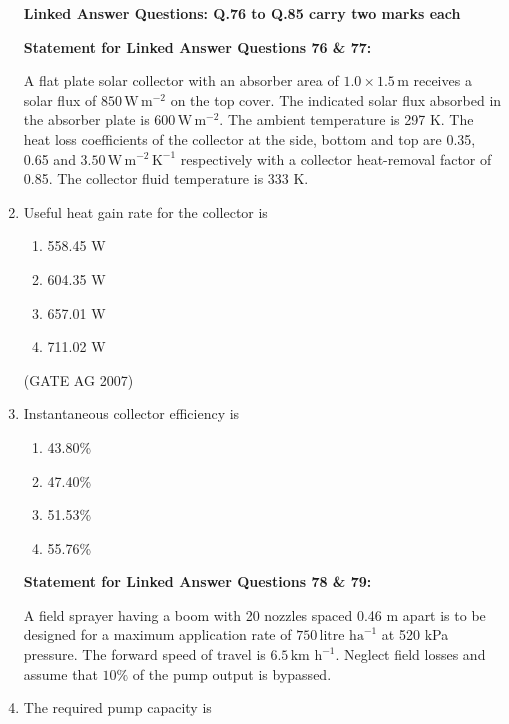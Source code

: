 \documentclass[journal,12pt,onecolumn]{IEEEtran}
\theoremstyle{remark}
\begin{document}
\begin{enumerate}[label=Q\arabic*:]
\textbf{Linked Answer Questions: Q.76 to Q.85 carry two marks each}


\textbf{Statement for Linked Answer Questions 76 \& 77:}

A flat plate solar collector with an absorber area of $1.0 \times 1.5 \, \text{m}$ receives a solar flux of $850 \, \text{W} \, \text{m}^{-2}$ on the top cover. The indicated solar flux absorbed in the absorber plate is $600 \, \text{W} \, \text{m}^{-2}$. The ambient temperature is 297 K. The heat loss coefficients of the collector at the side, bottom and top are 0.35, 0.65 and $3.50 \, \text{W} \, \text{m}^{-2} \, \text{K}^{-1}$ respectively with a collector heat-removal factor of 0.85. The collector fluid temperature is 333 K.

\item Useful heat gain rate for the collector is
\begin{multicols}{4}
\begin{enumerate}
\item 558.45 W
\item 604.35 W
\item 657.01 W
\item 711.02 W
\end{enumerate}
\end{multicols}
\hfill(GATE AG 2007)

\item Instantaneous collector efficiency is
\begin{multicols}{4}
\begin{enumerate}
\item 43.80\%
\item 47.40\%
\item 51.53\%
\item 55.76\%
\end{enumerate}
\end{multicols}

\textbf{Statement for Linked Answer Questions 78 \& 79:}



A field sprayer having a boom with 20 nozzles spaced 0.46 m apart is to be designed for a maximum application rate of $750 \, \text{litre ha}^{-1}$ at 520 kPa pressure. The forward speed of travel is $6.5 \, \text{km h}^{-1}$. Neglect field losses and assume that $10\%$ of the pump output is bypassed.



\item The required pump capacity is


\end{enumerate}
\end{document}
